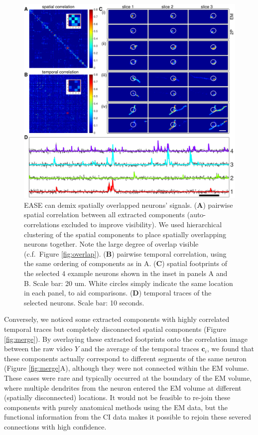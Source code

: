 \documentclass[10pt,letterpaper]{article}
\begin{document}
{\begin{figure}[t!]
	\centering
	\includegraphics[width=1\textwidth]{Figs/fig_demixing_example.pdf}
	\caption{EASE can demix spatially overlapped neurons' signals. (\textbf{A}) pairwise spatial correlation between all extracted components (auto-correlations excluded to improve visibility). We used hierarchical clustering of the spatial components to place spatially overlapping neurons together.  Note the large degree of overlap visible (c.f.~Figure \ref{fig:overlap}). (\textbf{B}) pairwise temporal correlation, using the same ordering of components as in A. (\textbf{C}) spatial footprints of the selected 4 example neurons shown in the inset in panels A and B. Scale bar: 20 um.  White circles simply indicate the same location in each panel, to aid comparisons. (\textbf{D}) temporal traces of the selected neurons. Scale bar: 10 seconds. }
\label{fig:demixing}
\end{figure}


Conversely, we noticed some extracted components with highly correlated temporal traces but completely disconnected spatial components (Figure \ref{fig:merge}). By overlaying these extracted footprints onto the correlation image between the raw video $Y$ and the average of the temporal traces $\bm{c}_i$, we found that these components actually correspond to different segments of the same neuron (Figure \ref{fig:merge}A), although they were not connected within the EM volume.  These cases were rare and typically occurred at the boundary of the EM volume, where multiple dendrites from the neuron entered the EM volume at different (spatially disconnected) locations.  It would not be feasible to re-join these components with purely anatomical methods using the EM data, but the functional information from the CI data makes it possible to rejoin these severed connections with high confidence.


}
\end{document}
